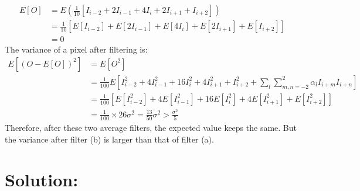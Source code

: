 \documentclass[12pt]{article}
\begin{document}
\begin{equation*}
\begin{aligned}
E[O] &= E\left(\frac{1}{10}\left[I_{i-2} + 2I_{i-1} + 4I_{i} + 2I_{i+1} + I_{i+2}\right]\right)\\
&= \frac{1}{10}\left[E[I_{i-2}] + E[2I_{i-1}] + E[4I_{i}] + E[2I_{i+1}] + E[I_{i+2}] \right] \\
&= 0
\end{aligned}
\end{equation*}
The variance of a pixel after filtering is:
\begin{equation*}
\begin{aligned}
E[(O-E[O])^2] &= E[O^2] \\
&=\frac{1}{100}E\left[ I^2_{i-2} + 4I^2_{i-1} + 16I^2_{i} + 4I^2_{i+1} + I^2_{i+2} +\sum_l\sum^2_{m,n = -2}\alpha_lI_{i+m}I_{i+n} \right]\\
&=\frac{1}{100}\left[ E[I^2_{i-2}] + 4E[I^2_{i-1}] + 16E[I^2_{i}] + 4E[I^2_{i+1}] + E[I^2_{i+2}] \right]\\
&=\frac{1}{100}\times26\sigma^2=\frac{13}{50}\sigma^2> \frac{\sigma^2}{5}
\end{aligned}
\end{equation*}
Therefore, after these two average filters, the expected value keeps the same. But the variance after filter (b) is larger than that of filter (a).
\section{Solution:}



\vfill
\clearpage
\end{document}

